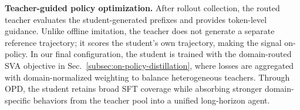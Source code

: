 \textbf{Teacher-guided policy optimization.}
After rollout collection, the routed teacher evaluates the student-generated prefixes and provides token-level guidance. Unlike offline imitation, the teacher does not generate a separate reference trajectory; it scores the student's own trajectory, making the signal on-policy. In our final configuration, the student is trained with the domain-routed SVA objective in Sec.~\ref{subsec:on-policy-distillation}, where losses are aggregated with domain-normalized weighting to balance heterogeneous teachers. Through OPD, the student retains broad SFT coverage while absorbing stronger domain-specific behaviors from the teacher pool into a unified long-horizon agent.




